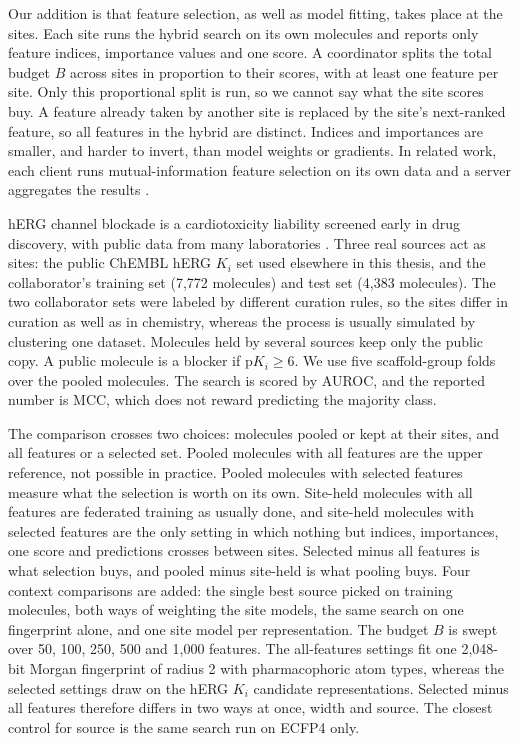 Our addition is that feature selection, as well as model fitting, takes place at the sites. Each site runs the hybrid search on its own molecules and reports only feature indices, importance values and one score. A coordinator splits the total budget $B$ across sites in proportion to their scores, with at least one feature per site. Only this proportional split is run, so we cannot say what the site scores buy. A feature already taken by another site is replaced by the site's next-ranked feature, so all features in the hybrid are distinct. Indices and importances are smaller, and harder to invert, than model weights or gradients. In related work, each client runs mutual-information feature selection on its own data and a server aggregates the results \citep{Cassara2022}.

hERG channel blockade is a cardiotoxicity liability screened early in drug discovery, with public data from many laboratories \citep{Czodrowski2013}. Three real sources act as sites: the public ChEMBL hERG $K_i$ set used elsewhere in this thesis, and the collaborator's training set (7,772 molecules) and test set (4,383 molecules). The two collaborator sets were labeled by different curation rules, so the sites differ in curation as well as in chemistry, whereas the process is usually simulated by clustering one dataset. Molecules held by several sources keep only the public copy. A public molecule is a blocker if $\mathrm{p}K_i \ge 6$. We use five scaffold-group folds over the pooled molecules. The search is scored by AUROC, and the reported number is MCC, which does not reward predicting the majority class.

The comparison crosses two choices: molecules pooled or kept at their sites, and all features or a selected set. Pooled molecules with all features are the upper reference, not possible in practice. Pooled molecules with selected features measure what the selection is worth on its own. Site-held molecules with all features are federated training as usually done, and site-held molecules with selected features are the only setting in which nothing but indices, importances, one score and predictions crosses between sites. Selected minus all features is what selection buys, and pooled minus site-held is what pooling buys. Four context comparisons are added: the single best source picked on training molecules, both ways of weighting the site models, the same search on one fingerprint alone, and one site model per representation. The budget $B$ is swept over 50, 100, 250, 500 and 1,000 features. The all-features settings fit one 2,048-bit Morgan fingerprint of radius 2 with pharmacophoric atom types, whereas the selected settings draw on the hERG $K_i$ candidate representations. Selected minus all features therefore differs in two ways at once, width and source. The closest control for source is the same search run on ECFP4 only.

